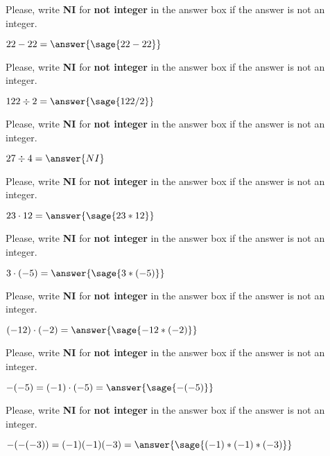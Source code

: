 \documentclass{ximera}
\begin{document}
\begin{problem}
Please, write \textbf{NI} for \textbf{not integer} in the answer box if the answer is not an integer.

$22-22=\answer{\sage{22-22}}$
\end{problem}


\begin{problem}
Please, write \textbf{NI} for \textbf{not integer} in the answer box if the answer is not an integer.

$122\div 2=\answer{\sage{122/2}}$
\end{problem}



\begin{problem}
Please, write \textbf{NI} for \textbf{not integer} in the answer box if the answer is not an integer.

$27\div 4=\answer{NI}$
\end{problem}


\begin{problem}
Please, write \textbf{NI} for \textbf{not integer} in the answer box if the answer is not an integer.

$23\cdot 12=\answer{\sage{23*12}}$
\end{problem}

\begin{problem}
Please, write \textbf{NI} for \textbf{not integer} in the answer box if the answer is not an integer.

$3\cdot (-5)=\answer{\sage{3*(-5)}}$
\end{problem}


\begin{problem}
Please, write \textbf{NI} for \textbf{not integer} in the answer box if the answer is not an integer.

$(-12)\cdot(-2)=\answer{\sage{-12*(-2)}}$
\end{problem}


\begin{problem}
Please, write \textbf{NI} for \textbf{not integer} in the answer box if the answer is not an integer.

$-(-5)=(-1)\cdot(-5)=\answer{\sage{-(-5)}}$
\end{problem}


\begin{problem}
Please, write \textbf{NI} for \textbf{not integer} in the answer box if the answer is not an integer.

$-(-(-3))=(-1)(-1)(-3)=\answer{\sage{(-1)*(-1)*(-3)}}$
\end{problem}
\end{document}
